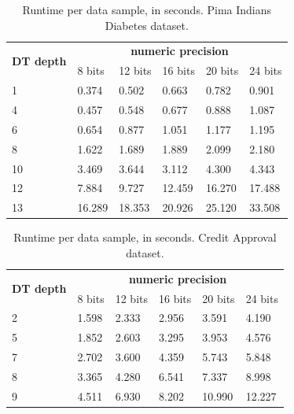 \begin{table}[H]
\centering
\caption{Runtime per data sample, in seconds. Pima Indians Diabetes dataset.}
\label{table:runtimeDTPID}
\begin{tabular}{|l|l|l|l|l|l|}
\hline
\multirow{2}{*}{\textbf{DT depth}} & \multicolumn{5}{c|}{\textbf{numeric precision}}         \\ \cline{2-6} 
                          & 8 bits & 12 bits & 16 bits & 20 bits & 24 bits \\ \hline
1                         & 0.374  & 0.502   & 0.663   & 0.782   & 0.901   \\ \hline
4                         & 0.457  & 0.548   & 0.677   & 0.888   & 1.087   \\ \hline
6                         & 0.654  & 0.877   & 1.051   & 1.177   & 1.195   \\ \hline
8                         & 1.622  & 1.689   & 1.889   & 2.099   & 2.180   \\ \hline
10                        & 3.469  & 3.644   & 3.112   & 4.300   & 4.343   \\ \hline
12                        & 7.884  & 9.727   & 12.459  & 16.270  & 17.488  \\ \hline
13                        & 16.289 & 18.353  & 20.926  & 25.120  & 33.508  \\ \hline
\end{tabular}
\end{table}

\begin{table}[H]
\centering
\caption{Runtime per data sample, in seconds. Credit Approval dataset.}
\label{table:runtimeDTCA}
\begin{tabular}{|l|l|l|l|l|l|}
\hline
\multirow{2}{*}{\textbf{DT depth}} & \multicolumn{5}{c|}{\textbf{numeric precision}}         \\ \cline{2-6} 
                          & 8 bits & 12 bits & 16 bits & 20 bits & 24 bits \\ \hline
2                         & 1.598  & 2.333   & 2.956   & 3.591   & 4.190   \\ \hline
5                         & 1.852  & 2.603   & 3.295   & 3.953   & 4.576   \\ \hline
7                         & 2.702  & 3.600   & 4.359   & 5.743   & 5.848   \\ \hline
8                         & 3.365  & 4.280   & 6.541   & 7.337   & 8.998   \\ \hline
9                         & 4.511  & 6.930   & 8.202   & 10.990  & 12.227  \\ \hline
\end{tabular}
\end{table}


